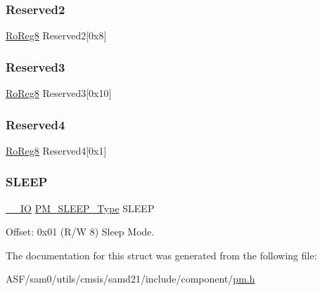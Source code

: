 \mbox{\label{struct_pm_a8bdc4a639d3a39ae271ce60299b45c28}} 
\subsubsection{\texorpdfstring{Reserved2}{Reserved2}}
{\footnotesize\ttfamily \mbox{\hyperlink{group___s_a_m_d21_e15_a__definitions_ga0d957f1433aaf5d70e4dc2b68288442d}{Ro\+Reg8}} Reserved2\mbox{[}0x8\mbox{]}}

\mbox{\label{struct_pm_a44e860edf7097c37fa2451e4884054eb}} 
\subsubsection{\texorpdfstring{Reserved3}{Reserved3}}
{\footnotesize\ttfamily \mbox{\hyperlink{group___s_a_m_d21_e15_a__definitions_ga0d957f1433aaf5d70e4dc2b68288442d}{Ro\+Reg8}} Reserved3\mbox{[}0x10\mbox{]}}

\mbox{\label{struct_pm_a5ca570382e961b7801aeafc161de2571}} 
\subsubsection{\texorpdfstring{Reserved4}{Reserved4}}
{\footnotesize\ttfamily \mbox{\hyperlink{group___s_a_m_d21_e15_a__definitions_ga0d957f1433aaf5d70e4dc2b68288442d}{Ro\+Reg8}} Reserved4\mbox{[}0x1\mbox{]}}

\mbox{\label{struct_pm_a79a4a4be9a7d3d340518340ad1e3ceb5}} 
\subsubsection{\texorpdfstring{SLEEP}{SLEEP}}
{\footnotesize\ttfamily \mbox{\hyperlink{core__cm0plus_8h_aec43007d9998a0a0e01faede4133d6be}{\+\_\+\+\_\+\+IO}} \mbox{\hyperlink{union_p_m___s_l_e_e_p___type}{P\+M\+\_\+\+S\+L\+E\+E\+P\+\_\+\+Type}} S\+L\+E\+EP}



Offset\+: 0x01 (R/W 8) Sleep Mode. 



The documentation for this struct was generated from the following file\+:\begin{DoxyCompactItemize}
\item 
A\+S\+F/sam0/utils/cmsis/samd21/include/component/\mbox{\hyperlink{component_2pm_8h}{pm.\+h}}\end{DoxyCompactItemize}
